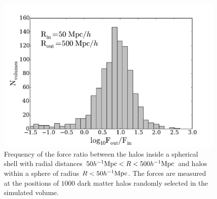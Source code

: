 \documentclass{article}
\newcommand{\hMpc}{{\ifmmode{h^{-1}{\rm Mpc}}\else{$h^{-1}$Mpc }\fi}}
\begin{document}
\begin{figure}
\begin{center}
\includegraphics[width=0.8\linewidth,angle=0]{spheres_nbody_200_1000.pdf}
\caption{\label{fig:spheres_nbody} Frequency of the force ratio between
  the halos inside a spherical shell with radial distances $50\hMpc <
  R < 500\hMpc$ and halos within a sphere of radius $R<50\hMpc$. The forces
  are measured at the positions of $1000$ dark matter halos randomly
  selected in the simulated volume.}
\end{center}
\end{figure}




 
\end{document}
